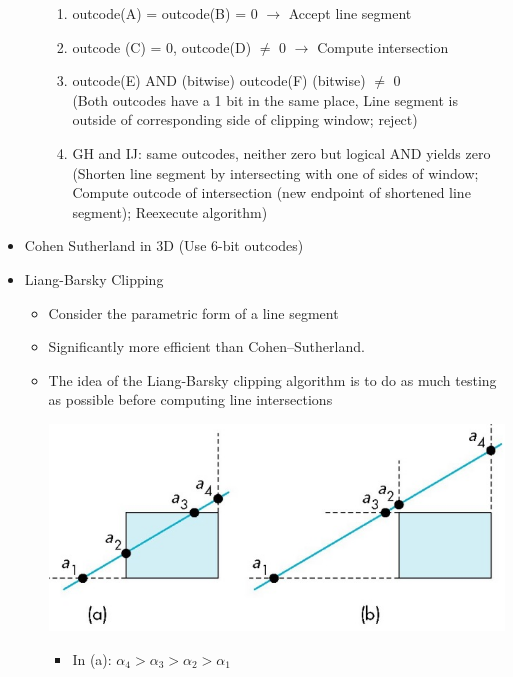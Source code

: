 \documentclass[11pt,a4paper]{article}
\begin{document}
\begin{itemize}
\begin{itemize}
\begin{center}
						\end{center}
						\begin{enumerate}
							\item outcode(A) = outcode(B) = 0 $\rightarrow$ Accept line segment
							\item outcode (C) = 0, outcode(D) $\ne$ 0 $\rightarrow$ Compute intersection
							\item outcode(E) AND (bitwise) outcode(F) (bitwise) $\ne$ 0\\
							(Both outcodes have a 1 bit in the same place, Line segment is outside of corresponding side of clipping window; reject)
							\item GH and IJ: same outcodes, neither zero but logical AND yields zero\\
							(Shorten line segment by intersecting with one of sides of window; Compute outcode of intersection (new endpoint of shortened line segment); Reexecute algorithm)
						\end{enumerate}
				\end{itemize}
			\item Cohen Sutherland in 3D (Use 6-bit outcodes)
			\item Liang-Barsky Clipping
				\begin{itemize}
					\item Consider the parametric form of a line segment
					\item Significantly more efficient than Cohen–Sutherland.
					\item The idea of the Liang-Barsky clipping algorithm is to do as much testing as possible before computing line intersections\\
					\begin{center}
						\includegraphics[scale=0.4]{pictures/LBClipping.jpg}
					\end{center}
						\begin{itemize}
							\item  In (a): $\alpha_4 > \alpha_3 > \alpha_2 > \alpha_1$\\

\end{itemize}
\end{itemize}
\end{itemize}
\end{document}

